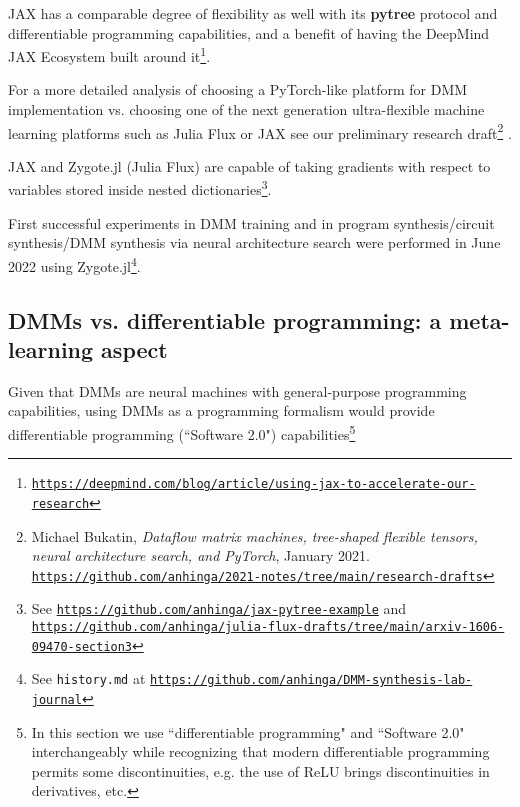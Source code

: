 \documentclass{article}
\begin{document}
JAX has a comparable degree of flexibility as well with its {\bf pytree} protocol and differentiable programming capabilities,
and a benefit of having the DeepMind JAX Ecosystem built around 
it\footnote{\href{https://deepmind.com/blog/article/using-jax-to-accelerate-our-research}
{\tt https://deepmind.com/blog/article/using-jax-to-accelerate-our-research}}. 

For a more detailed analysis of choosing a PyTorch-like platform for DMM implementation vs. choosing one of the next generation ultra-flexible
machine learning platforms such as Julia Flux or JAX see our preliminary research 
draft\footnote{Michael Bukatin, {\em Dataflow matrix machines, tree-shaped flexible tensors, neural architecture search, 
and PyTorch}, January 2021. \href{https://github.com/anhinga/2021-notes/tree/main/research-drafts}
{\tt https://github.com/anhinga/2021-notes/tree/main/research-drafts}} . 

JAX and Zygote.jl (Julia Flux) are capable of taking gradients with respect to variables stored inside 
nested dictionaries\footnote{See \href{https://github.com/anhinga/jax-pytree-example}{\tt https://github.com/anhinga/jax-pytree-example}
and\\ \href{https://github.com/anhinga/julia-flux-drafts/tree/main/arxiv-1606-09470-section3}
{\tt https://github.com/anhinga/julia-flux-drafts/tree/main/arxiv-1606-09470-section3}}.

First successful experiments in DMM training and in program synthesis/circuit synthesis/DMM synthesis via neural architecture search
were performed in June 2022 using Zygote.jl\footnote{See {\tt history.md} at
\href{https://github.com/anhinga/DMM-synthesis-lab-journal}{\tt https://github.com/anhinga/DMM-synthesis-lab-journal}}.

\subsection{DMMs vs. differentiable programming: a meta-learning aspect}

Given that DMMs are neural machines with general-purpose programming capabilities, using DMMs as a programming
formalism would provide differentiable programming (``Software 2.0") capabilities\footnote{In this section we use 
``differentiable programming" and ``Software 2.0" interchangeably while recognizing that modern differentiable
programming permits some discontinuities, e.g. the use of ReLU brings discontinuities in derivatives, etc.}
\end{document}
